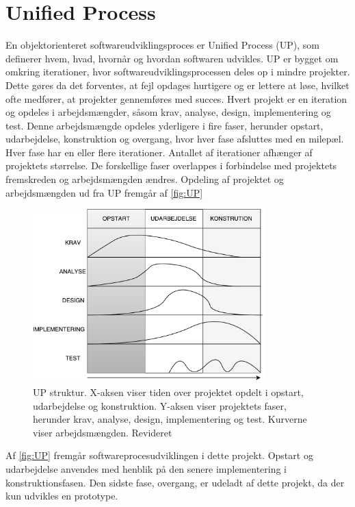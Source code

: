 \section{Unified Process}
En objektorienteret softwareudviklingsproces er Unified Process (UP), som definerer hvem, hvad, hvornår og hvordan softwaren udvikles. UP er bygget om omkring iterationer, hvor softwareudviklingsprocessen deles op i mindre projekter. Dette gøres da det forventes, at fejl opdages hurtigere og er lettere at løse, hvilket ofte medfører, at projekter gennemføres med succes. Hvert projekt er en iteration og opdeles i arbejdsmængder, såsom krav, analyse, design, implementering og test. Denne arbejdsmængde opdeles yderligere i fire faser, herunder opstart, udarbejdelse, konstruktion og overgang, hvor hver fase afsluttes med en milepæl. Hver fase har en eller flere iterationer. Antallet af iterationer afhænger af projektets størrelse. De forskellige faser overlappes i forbindelse med projektets fremskreden og arbejdsmængden ændres.\cite{Arlow2002} Opdeling af projektet og arbejdsmængden ud fra UP fremgår af \autoref{fig:UP}

\begin{figure} [H]
\centering
\includegraphics[width=0.8\textwidth]{figures/UP}
\caption{UP struktur. X-aksen viser tiden over projektet opdelt i opstart, udarbejdelse og konstruktion. Y-aksen viser projektets faser, herunder krav, analyse, design, implementering og test. Kurverne viser arbejdsmængden. Revideret \cite{Arlow2002}}
\label{fig:UP}
\end{figure} 

\noindent
Af \autoref{fig:UP} fremgår softwareprocesudviklingen i dette projekt. Opstart og udarbejdelse anvendes med henblik på den senere implementering i konstruktionsfasen. Den sidste fase, overgang, er udeladt af dette projekt, da der kun udvikles en prototype. 

